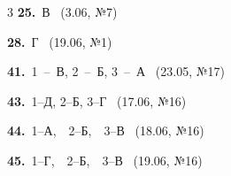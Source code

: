 \documentclass[12pt]{article}
\begin{document}
\ifshowsolutions
{}
\begin{multicols}{3}\noindent
\noindent\textbf{25.}~В \ {\scriptsize\color{gray}(3.06, №7)}\par
\noindent\textbf{28.}~Г \ {\scriptsize\color{gray}(19.06, №1)}\par
\noindent\textbf{41.}~1~--~В, 2~--~Б, 3~--~А \ {\scriptsize\color{gray}(23.05, №17)}\par
\noindent\textbf{43.}~1--Д, 2--Б, 3--Г \ {\scriptsize\color{gray}(17.06, №16)}\par
\noindent\textbf{44.}~1--А,\ \ 2--Б,\ \ 3--В \ {\scriptsize\color{gray}(18.06, №16)}\par
\noindent\textbf{45.}~1--Г,\ \ 2--Б,\ \ 3--В \ {\scriptsize\color{gray}(19.06, №16)}\par
\end{multicols}
\fi

\endgroup
\end{document}
